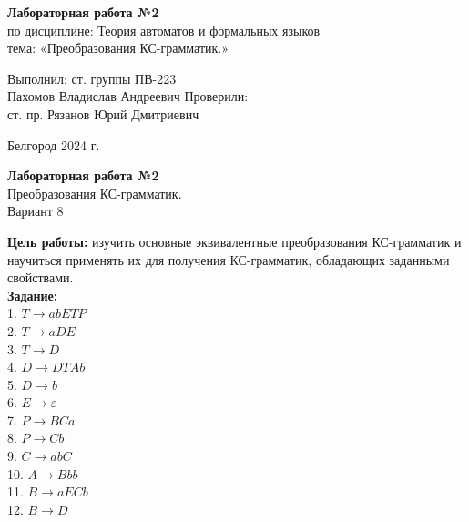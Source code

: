 \documentclass[a4paper,14pt]{extarticle}
\newcommand\textbox[1]{
	\parbox{.45\textwidth}{#1}
}
\begin{document}
\vfill
\begin{center}
    \large{
        \textbf{
            Лабораторная работа №2}}\\
    \normalsize{
        по дисциплине: Теория автоматов и формальных языков \\
        тема: «Преобразования КС-грамматик.»}
\end{center}
\vfill
\hfill\textbox{
    Выполнил: ст. группы ПВ-223\\Пахомов Владислав Андреевич
    \bigbreak
    Проверили: \\ст. пр. Рязанов Юрий Дмитриевич
}
\vfill\begin{center}
    Белгород 2024 г.
\end{center}
\newpage
\begin{center}
    \textbf{Лабораторная работа №2}\\
    Преобразования КС-грамматик.\\
    Вариант 8
\end{center}
\textbf{Цель работы: }изучить основные эквивалентные преобразования
КС-грамматик и научиться применять их для получения
КС-грамматик, обладающих заданными свойствами.\\
\textbf{Задание: }\\
    1. $T \rightarrow abETP$\\
    2. $T \rightarrow aDE$\\
    3. $T \rightarrow D$\\
    4. $D \rightarrow DTAb$\\
    5. $D \rightarrow b$\\
    6. $E \rightarrow \varepsilon$\\
    7. $P \rightarrow BCa$\\
    8. $P \rightarrow Cb$\\
    9. $C \rightarrow abC$\\
    10. $A \rightarrow Bbb$\\
    11. $B \rightarrow aECb$\\
    12. $B \rightarrow D$\\
\end{document}
